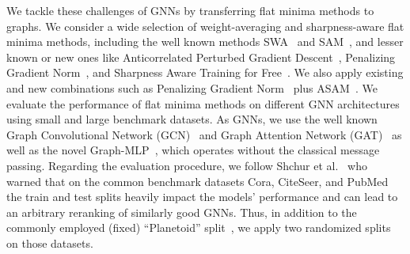 \documentclass[runningheads]{llncs}
\newcommand{\GraphMLP}{Graph-MLP\xspace}
\begin{document}
We tackle these challenges of GNNs by transferring flat minima methods to graphs.
We consider a wide selection of weight-averaging and sharpness-aware flat minima methods, 
including the well known methods SWA~\cite{swa} and SAM~\cite{Foret21sharpness}, and lesser known or new ones like
Anticorrelated Perturbed Gradient Descent~\cite{orvieto2022anticorrelated}, Penalizing Gradient Norm~\cite{zhao2022penalizing}, and Sharpness Aware Training for Free~\cite{SAF}.
We also apply existing and new combinations such as Penalizing Gradient Norm~\cite{orvieto2022anticorrelated} plus ASAM~\cite{Kwon21asam}.
We evaluate the performance of flat minima methods on different GNN architectures using small and large benchmark datasets.
As GNNs, we use the well known Graph Convolutional Network (GCN)~\cite{Kipf17gcn} and Graph Attention Network (GAT)~\cite{Velickovic18gat} as well as the novel \GraphMLP~\cite{graphMLPwoMP}, which operates without the classical message passing.
Regarding the evaluation procedure, we follow Shchur et al.~\cite{Shchur18pitfalls} who warned that on the common benchmark datasets Cora, CiteSeer, and PubMed the train and test splits heavily impact the models' performance and can lead to an arbitrary reranking of similarly good GNNs.
Thus, in addition to the commonly employed (fixed) ``Planetoid'' split~\cite{planetoid16Yang}, we apply two randomized splits on those datasets.
\end{document}
